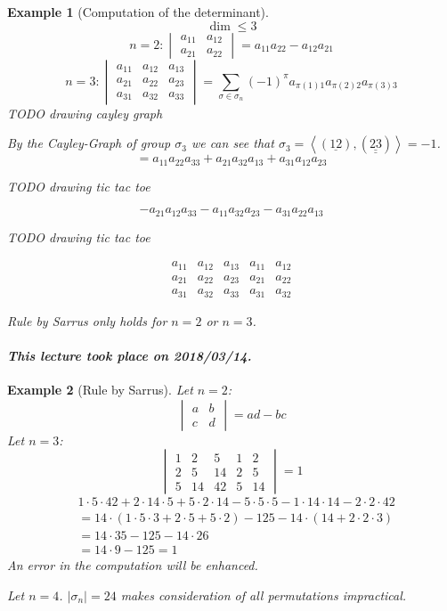 \documentclass{article}
\newtheorem{example}{Example}  \numberwithin{example}{section}
\newcommand{\angel}[1]{\left\langle#1\right\rangle}
\newcommand{\card}[1]{\left|#1\right|}
\newcommand{\dateref}[1]{\paragraph{\textit{This lecture took place on #1.}}}
\begin{document}
\begin{example}[Computation of the determinant]
  \[ \dim \leq 3 \]
  \[
    n = 2:
    \begin{vmatrix} a_{11} & a_{12} \\ a_{21} & a_{22} \end{vmatrix} = a_{11} a_{22} - a_{12} a_{21}
  \] \[
    n = 3:
    \begin{vmatrix} a_{11} & a_{12} & a_{13} \\ a_{21} & a_{22} & a_23 \\ a_{31} & a_{32} & a_{33} \end{vmatrix}
    = \sum_{\sigma \in \sigma_n} (-1)^\pi a_{\pi(1)1} a_{\pi(2)2} a_{\pi(3)3}
  \]
  TODO drawing cayley graph

  By the Cayley-Graph of group $\sigma_3$ we can see that $\sigma_3 = \angel{(\underline{12}), (\underline{\underline{23}})} = -1$.
  \[ = a_{11} a_{22} a_{33} + a_{21} a_{32} a_{13} + a_{31} a_{12} a_{23} \]

  TODO drawing tic tac toe

  \[ -a_{21} a_{12} a_{33} - a_{11} a_{32} a_{23} - a_{31} a_{22} a_{13} \]

  TODO drawing tic tac toe

  \[
    \begin{array}{ccc|cc}
      a_{11} & a_{12} & a_{13} & a_{11} & a_{12} \\
      a_{21} & a_{22} & a_{23} & a_{21} & a_{22} \\
      a_{31} & a_{32} & a_{33} & a_{31} & a_{32}
    \end{array}
  \]

  \emph{Rule by Sarrus} only holds for $n=2$ or $n=3$.
\end{example}

\dateref{2018/03/14}

\begin{example}[Rule by Sarrus]
  Let $n=2$:
  \[
    \begin{vmatrix} a & b \\ c & d \end{vmatrix} = ad - bc
  \]
  Let $n = 3$:
  \[
    \begin{vmatrix}
      1 & 2 & 5 & 1 & 2 \\
      2 & 5 & 14 & 2 & 5 \\
      5 & 14 & 42 & 5 & 14
    \end{vmatrix}
    = 1
  \]
  \begin{align*}
    &1 \cdot 5 \cdot 42 + 2 \cdot 14 \cdot 5 + 5 \cdot 2 \cdot 14 - 5 \cdot 5 \cdot 5 - 1 \cdot 14 \cdot 14 - 2 \cdot 2 \cdot 42 \\
      &= 14 \cdot (1 \cdot 5 \cdot 3 + 2 \cdot 5 + 5 \cdot 2) - 125 - 14 \cdot (14 + 2 \cdot 2 \cdot 3) \\
      &= 14 \cdot 35 - 125 - 14 \cdot 26 \\
      &= 14 \cdot 9 - 125 = 1
  \end{align*}
  An error in the computation will be enhanced.

  Let $n = 4$.
  $\card{\sigma_n} = 24$ makes consideration of all permutations impractical.
\end{example}
\end{document}
